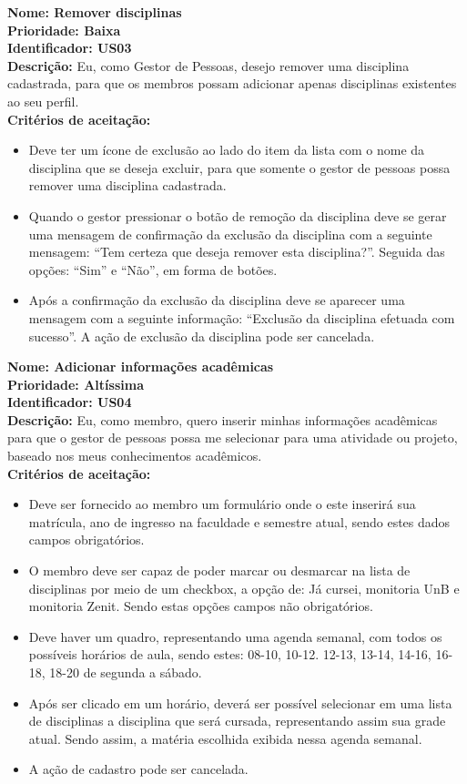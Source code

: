 \begin{anexosenv}
\indent \textbf{Nome: Remover disciplinas\\
    \indent Prioridade: Baixa\\
    \indent Identificador: US03\\
    \indent Descrição:} Eu, como Gestor de Pessoas, desejo remover uma disciplina cadastrada, para que os membros possam adicionar apenas disciplinas existentes ao seu perfil.\\
\indent \textbf{Critérios de aceitação:}        
 \begin{itemize}
            \item Deve ter um ícone de exclusão ao lado do item da lista com o nome da disciplina que se deseja excluir, para que somente o gestor de pessoas possa remover uma disciplina cadastrada.
            \item Quando o gestor pressionar o botão de remoção da disciplina deve se gerar uma mensagem de confirmação da exclusão da disciplina com a seguinte mensagem: “Tem certeza que deseja remover esta disciplina?”. Seguida das opções: “Sim” e “Não”, em forma de botões. 
            \item Após a confirmação da exclusão da disciplina deve se aparecer uma mensagem com a seguinte informação: “Exclusão da disciplina efetuada com sucesso”.
            A ação de exclusão da disciplina pode ser cancelada.
\end{itemize}

\indent \textbf{Nome: Adicionar informações acadêmicas\\
    \indent Prioridade: Altíssima\\
    \indent Identificador: US04\\
    \indent Descrição:} Eu, como membro, quero inserir minhas informações acadêmicas para que o gestor de pessoas possa me selecionar para uma atividade ou projeto, baseado nos meus conhecimentos acadêmicos.\\
\indent \textbf{Critérios de aceitação:}        
\begin{itemize}
    \item Deve ser fornecido ao membro um formulário onde o este inserirá sua matrícula, ano de ingresso na faculdade e semestre atual, sendo estes dados campos obrigatórios.
    \item O membro deve ser capaz de poder marcar ou desmarcar na lista de disciplinas por meio de um checkbox, a opção de: Já cursei, monitoria UnB e monitoria Zenit. Sendo estas opções campos não obrigatórios.
    \item Deve haver um quadro, representando uma agenda semanal, com todos os possíveis horários de aula, sendo estes: 08-10, 10-12. 12-13, 13-14, 14-16, 16-18, 18-20 de segunda a sábado. 
    \item Após ser clicado em um horário, deverá ser possível selecionar em uma lista de disciplinas a disciplina que será cursada, representando assim sua grade atual. Sendo assim, a matéria escolhida exibida nessa agenda semanal.
    \item A ação de cadastro pode ser cancelada.
\end{itemize}


\end{anexosenv}
